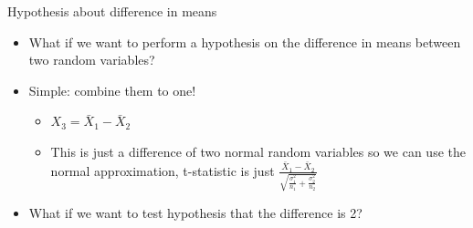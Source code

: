 \documentclass[aspectratio=169]{beamer}
\begin{document}
\begin{frame}{Hypothesis about difference in means}
    \begin{itemize}
        \item What if we want to perform a hypothesis on the difference in means between two random variables?
        \item Simple: combine them to one!
        \begin{itemize}
            \item $X_3 = \bar{X}_1 - \bar{X}_2$
            \item This is just a difference of two normal random variables so we can use the normal approximation, t-statistic is just $\frac{\bar{X}_1 - \bar{X}_2}{\sqrt{\frac{\sigma_1^2}{n_1} + \frac{\sigma_2^2}{n_2}}}$
        \end{itemize}
        \item What if we want to test hypothesis that the difference is 2?
    \end{itemize}
\end{frame}
\end{document}
